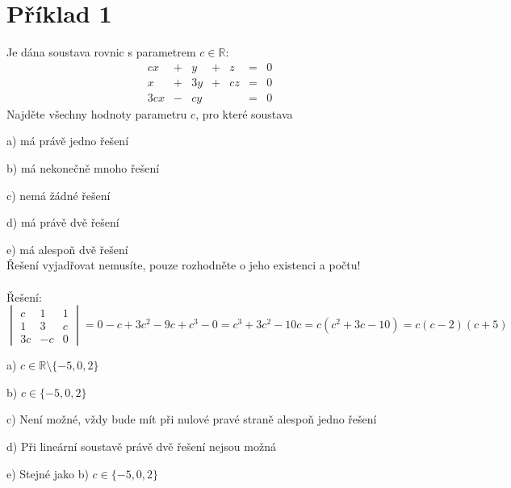 \section*{Příklad 1}
Je dána soustava rovnic s parametrem $c \in \mathbb{R}$:
$$
\begin{matrix}
    cx & + & y & + & z & = & 0 \\
    x  & + & 3y & + & cz & = & 0 \\
    3cx & - & cy & & & = & 0
\end{matrix}
$$
Najděte všechny hodnoty parametru $c$, pro které soustava

a) má právě jedno řešení

b) má nekonečně mnoho řešení

c) nemá žádné řešení

d) má právě dvě řešení

e) má alespoň dvě řešení \\
Řešení vyjadřovat nemusíte, pouze rozhodněte o jeho existenci a počtu!\\\\
Řešení:
$$
\begin{vmatrix}
  c  & 1 & 1   \\
  1  & 3  & c   \\
  3c & -c  & 0
\end{vmatrix}
= 0 - c + 3c^2 - 9c + c^3 - 0 = c^3 + 3c^2 - 10c
= c \left(c^2 + 3c - 10\right)
= c (c - 2)(c + 5)
$$

a) $ c \in \mathbb{R} \setminus \{-5, 0, 2\} $

b) $ c \in  \{-5, 0, 2\} $

c) Není možné, vždy bude mít při nulové pravé straně alespoň jedno řešení

d) Při lineární soustavě právě dvě řešení nejsou možná

e) Stejné jako b) \implies $ c \in  \{-5, 0, 2\} $